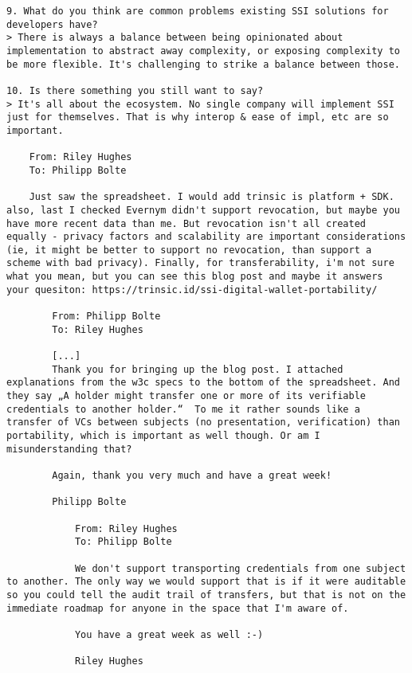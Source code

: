 \begin{Verbatim}[breaklines=true, breaksymbol={}, breaksymbolsepleftnchars=2]
9. What do you think are common problems existing SSI solutions for developers have? 
> There is always a balance between being opinionated about implementation to abstract away complexity, or exposing complexity to be more flexible. It's challenging to strike a balance between those.

10. Is there something you still want to say?
> It's all about the ecosystem. No single company will implement SSI just for themselves. That is why interop & ease of impl, etc are so important.

    From: Riley Hughes
    To: Philipp Bolte
    
    Just saw the spreadsheet. I would add trinsic is platform + SDK. also, last I checked Evernym didn't support revocation, but maybe you have more recent data than me. But revocation isn't all created equally - privacy factors and scalability are important considerations (ie, it might be better to support no revocation, than support a scheme with bad privacy). Finally, for transferability, i'm not sure what you mean, but you can see this blog post and maybe it answers your quesiton: https://trinsic.id/ssi-digital-wallet-portability/

        From: Philipp Bolte
        To: Riley Hughes
        
        [...]
        Thank you for bringing up the blog post. I attached explanations from the w3c specs to the bottom of the spreadsheet. And they say „A holder might transfer one or more of its verifiable credentials to another holder.“  To me it rather sounds like a transfer of VCs between subjects (no presentation, verification) than portability, which is important as well though. Or am I misunderstanding that?
        
        Again, thank you very much and have a great week!
        
        Philipp Bolte

            From: Riley Hughes
            To: Philipp Bolte
            
            We don't support transporting credentials from one subject to another. The only way we would support that is if it were auditable so you could tell the audit trail of transfers, but that is not on the immediate roadmap for anyone in the space that I'm aware of.
            
            You have a great week as well :-)
            
            Riley Hughes
\end{Verbatim}


